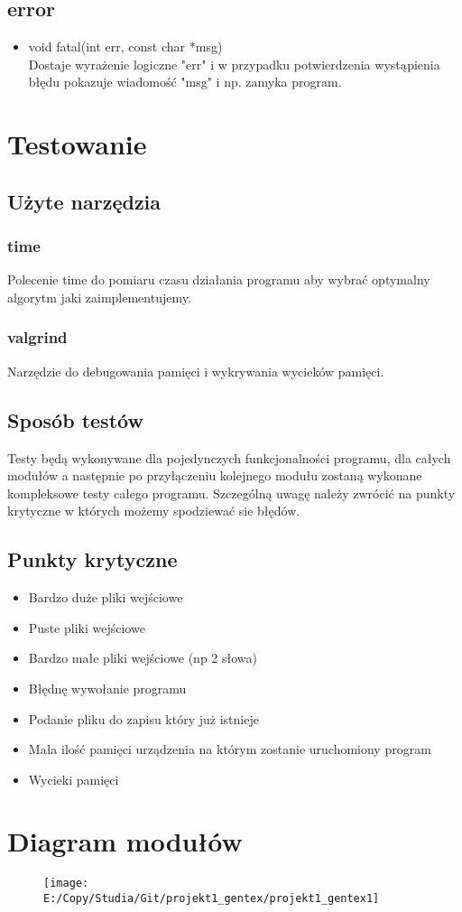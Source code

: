 \documentclass[12pt,a4paper]{report}
\begin{document}
	\subsection*{error} 
		\begin{itemize}
			
			\item void fatal(int err, const char *msg)\\
			Dostaje wyrażenie logiczne "err" i w przypadku potwierdzenia wystąpienia błędu pokazuje wiadomość "msg" i np. zamyka program.
		\end{itemize}

\section*{Testowanie}

	\subsection*{Użyte narzędzia}
	
		\subsubsection*{time} Polecenie time do pomiaru czasu działania programu aby wybrać optymalny algorytm jaki zaimplementujemy.
		
		\subsubsection*{valgrind} Narzędzie do debugowania pamięci i wykrywania wycieków pamięci.

	\subsection*{Sposób testów} Testy będą wykonywane dla pojedynczych funkcjonalności programu, dla całych modułów a następnie po przyłączeniu kolejnego modułu zostaną wykonane kompleksowe testy całego programu. Szczególną uwagę należy zwrócić na punkty krytyczne w których możemy spodziewać sie błędów.

	\subsection*{Punkty krytyczne} 
		\begin{itemize}
			
			\item Bardzo duże pliki wejściowe
			\item Puste pliki wejściowe
			\item Bardzo małe pliki wejściowe (np 2 słowa)
			\item Błędnę wywołanie programu
			\item Podanie pliku do zapisu który już istnieje
			\item Mała ilość pamięci urządzenia na którym zostanie uruchomiony program
			\item Wycieki pamięci
			
		\end{itemize}

\section*{Diagram modułów} \begin{figure}
\centering
\texttt{[image: E:/Copy/Studia/Git/projekt1\_gentex/projekt1\_gentex1]}
\caption{}
\label{fig:projekt1_gentex1}
\end{figure}
\end{document}
